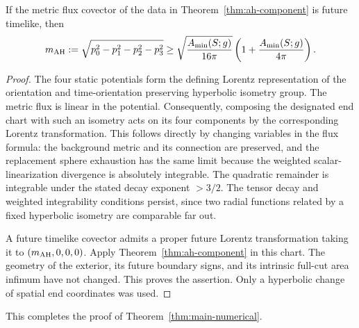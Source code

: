 \begin{theorem}\label{thm:ah-invariant}
If the metric flux covector of the data in
Theorem~\ref{thm:ah-component} is future timelike, then
\[
 m_{\rm AH}:=\sqrt{p_0^2-p_1^2-p_2^2-p_3^2}
 \ge
 \sqrt{\frac{A_{\min}(S;g)}{16\pi}}
 \left(1+\frac{A_{\min}(S;g)}{4\pi}\right).
\]
\end{theorem}

\begin{proof}
The four static potentials form the defining Lorentz representation
of the orientation and time-orientation preserving hyperbolic
isometry group. The metric flux is linear in the potential.
Consequently, composing the designated end chart with such an
isometry acts on its four components by the corresponding Lorentz
transformation. This follows directly by changing variables in
the flux formula: the background metric and its connection are
preserved, and the replacement sphere exhaustion has the same
limit because the weighted scalar-linearization divergence is
absolutely integrable. The quadratic remainder is integrable
under the stated decay exponent \(>3/2\).
The tensor decay and weighted integrability conditions persist,
since two radial functions related by a fixed hyperbolic isometry
are comparable far out.

A future timelike covector admits a proper future Lorentz
transformation taking it to \((m_{\rm AH},0,0,0)\).
Apply Theorem~\ref{thm:ah-component} in this chart. The geometry of
the exterior, its future boundary signs, and its intrinsic full-cut
area infimum have not changed. This proves the assertion.
Only a hyperbolic change of spatial end coordinates was used.
\end{proof}

This completes the proof of Theorem~\ref{thm:main-numerical}.
